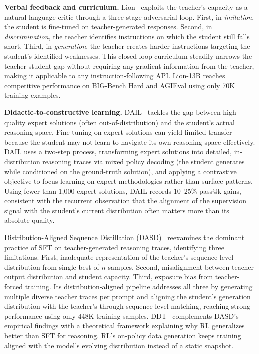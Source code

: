 \documentclass{article} %
\begin{document}
\textbf{Verbal feedback and curriculum.} Lion~\citep{2305.12870} exploits the teacher's capacity as a natural language critic through a three-stage adversarial loop. First, in \emph{imitation}, the student is fine-tuned on teacher-generated responses. Second, in \emph{discrimination}, the teacher identifies instructions on which the student still falls short. Third, in \emph{generation}, the teacher creates harder instructions targeting the student's identified weaknesses. This closed-loop curriculum steadily narrows the teacher-student gap without requiring any gradient information from the teacher, making it applicable to any instruction-following API. Lion-13B reaches competitive performance on BIG-Bench Hard and AGIEval using only 70K training examples.

\textbf{Didactic-to-constructive learning.} DAIL~\citep{2602.02405} tackles the gap between high-quality expert solutions (often out-of-distribution) and the student's actual reasoning space. Fine-tuning on expert solutions can yield limited transfer because the student may not learn to navigate its own reasoning space effectively. DAIL uses a two-step process, transforming expert solutions into detailed, in-distribution reasoning traces via mixed policy decoding (the student generates while conditioned on the ground-truth solution), and applying a contrastive objective to focus learning on expert methodologies rather than surface patterns. Using fewer than 1,000 expert solutions, DAIL records 10--25\% pass@k gains, consistent with the recurrent observation that the alignment of the supervision signal with the student's current distribution often matters more than its absolute quality.

Distribution-Aligned Sequence Distillation (DASD)~\citep{2601.09088} reexamines the dominant practice of SFT on teacher-generated reasoning traces, identifying three limitations. First, inadequate representation of the teacher's sequence-level distribution from single best-of-$n$ samples. Second, misalignment between teacher output distribution and student capacity. Third, exposure bias from teacher-forced training. Its distribution-aligned pipeline addresses all three by generating multiple diverse teacher traces per prompt and aligning the student's generation distribution with the teacher's through sequence-level matching, reaching strong performance using only 448K training samples. DDT~\citep{2602.12222} complements DASD's empirical findings with a theoretical framework explaining why RL generalizes better than SFT for reasoning. RL's on-policy data generation keeps training aligned with the model's evolving distribution instead of a static snapshot.
\end{document}

